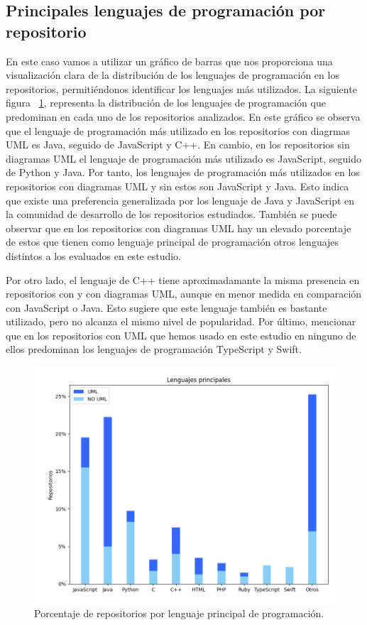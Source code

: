 \documentclass[a4paper, 12pt]{book}
\begin{document}
\subsection{Principales lenguajes de programación por repositorio}
\label{sec:Gráfico de barras de los lenguages principales de programación por repositorio}

En este caso vamos a utilizar un gráfico de barras que nos proporciona una visualización clara de la distribución de los lenguajes de programación en los repositorios, permitiéndonos identificar los lenguajes más utilizados.
La siguiente figura ~\ref{fig:Figure_language}, representa la distribución de los lenguajes de programación que predominan en cada uno de los repositorios analizados.
En este gráfico se observa que el lenguaje de programación más utilizado en los repositorios con diagrmas UML es Java, seguido de JavaScript y C++.
En cambio, en los repositorios sin diagramas UML el lenguaje de programación más utilizado es JavaScript, seguido de Python y Java.
Por tanto, los lenguajes de programación más utilizados en los repositorios con diagramas UML y sin estos son JavaScript y Java. 
Esto indica que existe una preferencia generalizada por los lenguaje de Java y JavaScript en la comunidad de desarrollo de los repositorios estudiados.
También se puede observar que en los repositorios con diagramas UML hay un elevado porcentaje de estos que tienen como lenguaje principal de programación otros lenguajes distintos a los evaluados en este estudio.


Por otro lado, el lenguaje de C++ tiene aproximadamante la misma presencia en repositorios con y con diagramas UML, aunque en menor medida en comparación con JavaScript o Java.
Esto sugiere que este lenguaje también es bastante utilizado, pero no alcanza el mismo nivel de popularidad.
Por último, mencionar que en los repositorios con UML que hemos usado en este estudio en ninguno de ellos predominan los lenguajes de programación TypeScript y Swift.

\begin{figure}
  \centering
  \includegraphics[width=12cm, keepaspectratio]{img/Figure_languages.png}
  \caption{Porcentaje de repositorios por lenguaje principal de programación.}\label{fig:Figure_language}
\end{figure}
\end{document}
